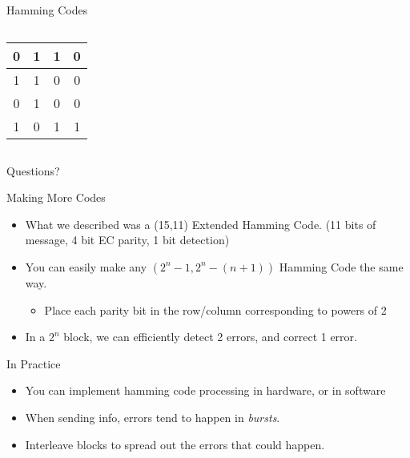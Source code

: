 \documentclass[aspectratio=169, handout]{beamer}
\makeatletter
\newcommand{\blu}[1]{{\color{sigma@mainblue}#1}}
\makeatother
\begin{document}
\begin{frame}{Hamming Codes}
\begin{columns}[c]
    \hfill
    \begin{column}{2cm}
    \begin{table}
        \centering
        \begin{tabular}{|c|c|c|c|}
            \hline     
            0 & 1 & 1 & 0 \\ \hline
            1 & 1 & \blu{0} & 0 \\ \hline
            \rowcolor{LightRed}
            0 & 1 & 0 & 0 \\ \hline
            \rowcolor{LightRed}
            1 & 0 & 1 & 1 \\ \hline
        \end{tabular}
    \end{table}
    \end{column}
    \end{columns}
\end{frame}

\begin{frame}{}
      \begin{center}
    {\color{sigma@mainblue} \LARGE Questions?}
  \end{center}
\end{frame}

\begin{frame}{Making More Codes}
    \begin{itemize}
        \item What we described was a (15,11) Extended Hamming Code. (11 bits of message, 4 bit EC parity, 1 bit detection) \pause
        \item You can easily make any $(2^n-1,2^n-(n+1))$ Hamming Code the same way. 
        \begin{itemize}
            \item Place each parity bit in the row/column corresponding to powers of 2 \pause 
        \end{itemize}
        \item In a $2^n$ block, we can efficiently detect 2 errors, and correct 1 error.
    \end{itemize}
\end{frame}

\begin{frame}{In Practice}
    \begin{itemize}
        \item You can implement hamming code processing in hardware, or in software
        \item When sending info, errors tend to happen in \textit{bursts}.
        \item Interleave blocks to spread out the errors that could happen.
    \end{itemize}
\end{frame}
\end{document}
